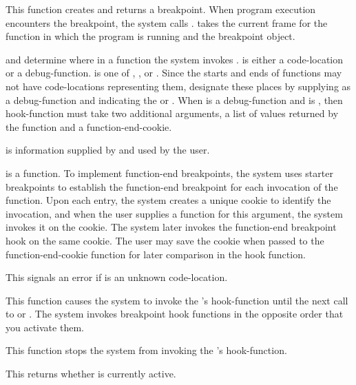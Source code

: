 {
This function creates and returns a breakpoint.  When program execution
encounters the breakpoint, the system calls .
 takes the current frame for the function in which the
program is running and the breakpoint object.

 and  determine where in a function the system invokes
.   is either a code-location or a
debug-function.   is one of , 
, or .  Since the starts and ends of
functions may not have code-locations representing them, designate these places
by supplying  as a debug-function and  indicating the
 or .  When  is a
debug-function and  is , then hook-function must
take two additional arguments, a list of values returned by the function and a
function-end-cookie.

 is information supplied by and used by the user.

 is a function.  To implement function-end
breakpoints, the system uses starter breakpoints to establish the function-end
breakpoint for each invocation of the function.  Upon each entry, the system
creates a unique cookie to identify the invocation, and when the user supplies
a function for this argument, the system invokes it on the cookie.  The system
later invokes the function-end breakpoint hook on the same cookie.  The user
may save the cookie when passed to the function-end-cookie function for
later comparison in the hook function.

This signals an error if  is an unknown code-location.
\enddefun


This function causes the system to invoke the 's hook-function
until the next call to  or .
The system invokes breakpoint hook functions in the opposite order that you
activate them.
\enddefun


This function stops the system from invoking the 's
hook-function.
\enddefun


This returns whether  is currently active.
\enddefun


}
